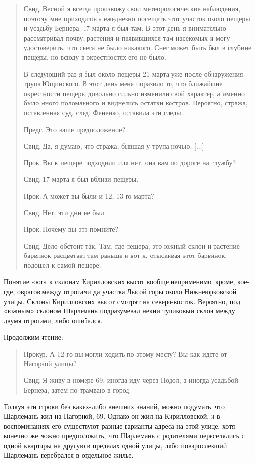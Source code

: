 \begin{quotation}
Свид. Весной я всегда произвожу свои метеорологические наблюдения, поэтому мне приходилось ежедневно посещать этот участок около пещеры и усадьбу Бернера. 17 марта я был там. В этот день я внимательно рассматривал почву, растения и появившихся там насекомых и могу удостоверить, что снега не было никакого. Снег может быть был в глубине пещеры, но всюду в окрестностях его не было.

В следующий раз я был около пещеры 21 марта уже после обнаружения трупа Ющинского. В этот день меня поразило то, что ближайшие окрестности пещеры довольно сильно изменили свой характер, а именно было много поломанного и виднелись остатки костров. Вероятно, стража, оставленная суд. след. Фененко, оставила эти следы.

Предс. Это ваше предположение?

Свид. Да, я думаю, что стража, бывшая у трупа ночью. [...]

Прок. Вы к пещере подходили или нет, она вам по дороге на службу?

Свид. 17 марта я был вблизи пещеры.

Прок. А может вы были и 12, 13-го марта?

Свид. Нет, эти дни не был. 

Прок. Почему вы это помните?

Свид. Дело обстоит так. Там, где пещера, это южный склон и растение барвинок расцветает там раньше и вот я, отыскивая этот барвинок, подошел к самой пещере.
\end{quotation}

Понятие «юг» к склонам Кирилловских высот вообще неприменимо, кроме, кое-где, оврагов между отрогами да участка Лысой горы около Нижнеюрковской улицы. Склоны Кирилловских высот смотрят на северо-восток. Вероятно, под «южным» склоном Шарлемань подразумевал некий тупиковый склон между двумя отрогами, либо ошибался.

Продолжим чтение:

\begin{quotation}
Прокур. А 12-го вы могли ходить по этому месту? Вы как идете от Нагорной улицы?

Свид. Я живу в номере 69, иногда иду через Подол, а иногда усадьбой Бернера, затем по трамваю в город.
\end{quotation}

Толкуя эти строки без каких-либо внешних знаний, можно подумать, что Шарлемань жил на Нагорной, 69. Однако он жил на Кирилловской, и в воспоминаниях его существуют разные варианты адреса на этой улице, хотя конечно же можно предположить, что Шарлемань с родителями переселялись с одной квартиры на другую в пределах одной улицы, либо повзрослевший Шарлемань перебрался в отдельное жилье.

